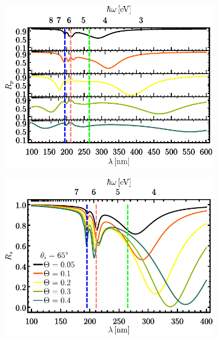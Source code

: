 	\begin{figure}[h!]\centering
	\begin{subfigure}{.01\linewidth}\caption{}\label{sfig:R-ATR10-cutp}\vspace{3.75cm}\end{subfigure}\hspace*{-.5em}
	\begin{subfigure}{.45\linewidth}\centering \includegraphics[scale=.75 ]{2-Resultados/figs/2-Wp10ThetaVar/cut_angle_65_p_Stack.pdf}\end{subfigure}
	\begin{subfigure}{.01\linewidth}\caption{}\label{sfig:R-ATR10-cuts}\vspace{3.75cm}\end{subfigure}\hspace*{-.5em}
	\begin{subfigure}{.45\linewidth}\centering \includegraphics[scale=.75 ]{2-Resultados/figs/2-Wp10ThetaVar/cut_angle_65_s.pdf}\end{subfigure}\vspace*{-.5em}

\end{figure}
